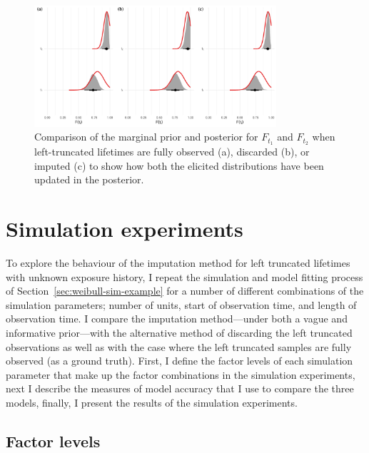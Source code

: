 \begin{figure}
    \centering
    \includegraphics[width=0.8\textwidth]{./figures/ch-2/prior-post-comp.pdf}
    \caption{Comparison of the marginal prior and posterior for $F_{t_1}$ and $F_{t_2}$ when left-truncated lifetimes are fully observed (a), discarded (b), or imputed (c) to show how both the elicited distributions have been updated in the posterior.}
    \label{fig:weibull-prior-post-comp}
\end{figure}

\section{Simulation experiments} \label{sec:weibull-sim-study}

To explore the behaviour of the imputation method for left truncated lifetimes with unknown exposure history, I repeat the simulation and model fitting process of Section~\ref{sec:weibull-sim-example} for a number of different combinations of the simulation parameters; number of units, start of observation time, and length of observation time. I compare the imputation method---under both a vague and informative prior---with the alternative method of discarding the left truncated observations as well as with the case where the left truncated samples are fully observed (as a ground truth). First, I define the factor levels of each simulation parameter that make up the factor combinations in the simulation experiments, next I describe the measures of model accuracy that I use to compare the three models, finally, I present the results of the simulation experiments.

\subsection{Factor levels}

